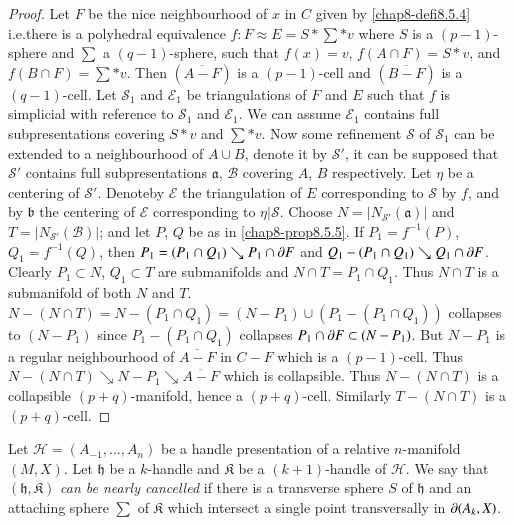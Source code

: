 \begin{proof}
Let $F$ be the nice neighbourhood of $x$ in $C$ given by \ref{chap8-defi8.5.4} i.e.\@ there is a polyhedral equivalence $f:F\approx E=S\ast \sum\ast v$ where $S$ is a $(p-1)$-sphere and $\sum$ a $(q-1)$-sphere, such that $f(x)=v$, $f(A\cap F)=S\ast v$, and $f(B\cap F)=\sum\ast v$. Then $(\overline{A-F})$ is a $(p-1)$-cell and $(\overline{B-F})$ is a $(q-1)$-cell. Let $\mathscr{S}_{1}$ and $\mathscr{E}_{1}$ be triangulations of $F$ and $E$ such that $f$ is simplicial with reference to $\mathscr{S}_{1}$ and $\mathscr{E}_{1}$. We can assume $\mathscr{E}_{1}$ contains full subpresentations covering $S\ast v$ and $\sum \ast v$. Now some 
refinement $\mathscr{S}$ of $\mathscr{S}_{1}$ can be extended to a neighbourhood of $A\cup B$, denote it by $\mathscr{S}'$, it can be supposed that $\mathscr{S}'$ contains full subpresentations $\mathfrak{a}$, $\mathscr{B}$ covering $A$, $B$ respectively. Let $\eta$ be a centering of $\mathscr{S}'$. Denote\pageoriginale by $\mathscr{E}$ the triangulation of $E$ corresponding to $\mathscr{S}$ by $f$, and by $\mathfrak{b}$ the centering of $\mathscr{E}$ corresponding to $\eta|\mathscr{S}$. Choose $N=|N_{\mathscr{S}'}(\mathfrak{a})|$ and $T=|N_{\mathscr{S}'}(\mathscr{B})|$; and let $P$, $Q$ be as in \ref{chap8-prop8.5.5}. If $P_{1}=f^{-1}(P)$, $Q_{1}=f^{-1}(Q)$, then $P_{1}=(P_{1}\cap Q_{1})\searrow P_{1}\cap\partial F$ and $Q_{1}-(P_{1}\cap Q_{1})\searrow Q_{1}\cap \partial F$. Clearly $P_{1}\subset N$, $Q_{1}\subset T$ are submanifolds and $N\cap T=P_{1}\cap Q_{1}$. Thus $N\cap T$ is a submanifold of both $N$ and $T$. $N-(N\cap T)=N-(P_{1}\cap Q_{1})=(N-P_{1})\cup (P_{1}-(P_{1}\cap Q_{1}))$ collapses to $(N-P_{1})$ since $P_{1}-(P_{1}\cap Q_{1})$ collapses
$P_{1}\cap\partial F\subset (N-P_{1})$. But $N-P_{1}$ is a regular neighbourhood of $\overline{A-F}$ in $C-F$ which is a $(p-1)$-cell. Thus $N-(N\cap T)\searrow N-P_{1}\searrow \overline{A-F}$ which is collapsible. Thus $N-(N\cap T)$ is a collapsible $(p+q)$-manifold, hence a $(p+q)$-cell. Similarly $T-(N\cap T)$ is a $(p+q)$-cell. 
\end{proof}

\begin{definition}\label{chap8-defi8.5.6}
Let $\mathscr{H}=(A_{-1},\ldots,A_{n})$ be a handle presentation of a relative $n$-manifold $(M,X)$. Let $\mathfrak{h}$ be a $k$-handle and $\mathfrak{K}$ be a $(k+1)$-handle of $\mathscr{H}$. We say that $(\mathfrak{h},\mathfrak{K})$ {\em can be nearly cancelled} if there is a transverse sphere $S$ of $\mathfrak{h}$ and an attaching sphere $\sum$ of $\mathfrak{K}$ which intersect a single point transversally in $\partial (A_{k},X)$.
\end{definition}


